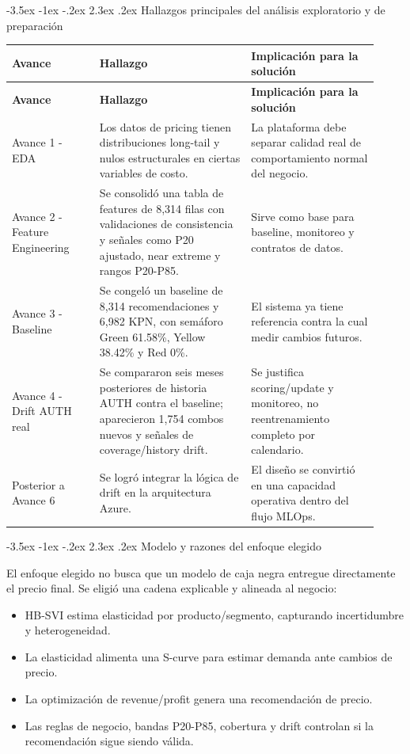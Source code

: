 \documentclass[11pt,letterpaper]{article}
\makeatletter
\renewcommand\section{\@startsection{section}{1}{\z@}
  {-3.5ex \@plus -1ex \@minus -.2ex}
  {2.3ex \@plus .2ex}
  {\Large\bfseries\sffamily\color{azulTec}}}
\makeatother
\begin{document}
\section{Hallazgos principales del análisis exploratorio y de preparación}

\begin{longtable}{L{0.22\linewidth}L{0.38\linewidth}L{0.32\linewidth}}
\toprule
\textbf{Avance} & \textbf{Hallazgo} & \textbf{Implicación para la solución} \\
\midrule
\endfirsthead
\toprule
\textbf{Avance} & \textbf{Hallazgo} & \textbf{Implicación para la solución} \\
\midrule
\endhead
Avance 1 - EDA & Los datos de pricing tienen distribuciones long-tail y nulos estructurales en ciertas variables de costo. & La plataforma debe separar calidad real de comportamiento normal del negocio. \\
Avance 2 - Feature Engineering & Se consolidó una tabla de features de 8,314 filas con validaciones de consistencia y señales como P20 ajustado, near extreme y rangos P20-P85. & Sirve como base para baseline, monitoreo y contratos de datos. \\
Avance 3 - Baseline & Se congeló un baseline de 8,314 recomendaciones y 6,982 KPN, con semáforo Green 61.58\%, Yellow 38.42\% y Red 0\%. & El sistema ya tiene referencia contra la cual medir cambios futuros. \\
Avance 4 - Drift AUTH real & Se compararon seis meses posteriores de historia AUTH contra el baseline; aparecieron 1,754 combos nuevos y señales de coverage/history drift. & Se justifica scoring/update y monitoreo, no reentrenamiento completo por calendario. \\
Posterior a Avance 6 & Se logró integrar la lógica de drift en la arquitectura Azure. & El diseño se convirtió en una capacidad operativa dentro del flujo MLOps. \\
\bottomrule
\end{longtable}

\section{Modelo y razones del enfoque elegido}

El enfoque elegido no busca que un modelo de caja negra entregue directamente el precio final. Se eligió una cadena explicable y alineada al negocio:

\begin{itemize}
  \item HB-SVI estima elasticidad por producto/segmento, capturando incertidumbre y heterogeneidad.
  \item La elasticidad alimenta una S-curve para estimar demanda ante cambios de precio.
  \item La optimización de revenue/profit genera una recomendación de precio.
  \item Las reglas de negocio, bandas P20-P85, cobertura y drift controlan si la recomendación sigue siendo válida.
\end{itemize}
\end{document}
